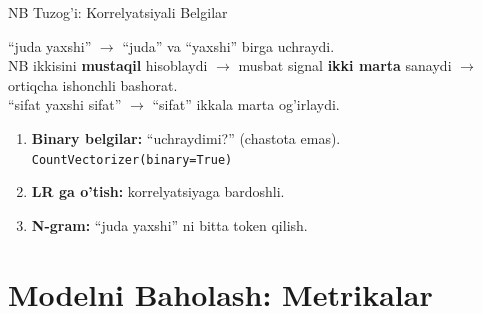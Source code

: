\documentclass[aspectratio=169,11pt]{beamer}
\begin{document}
\begin{frame}{NB Tuzog'i: Korrelyatsiyali Belgilar}
  \begin{tcolorbox}[warnbox,title=Muammo: CI taxmini buziladi]
    \small
    ``juda yaxshi'' $\to$ ``juda'' va ``yaxshi'' birga uchraydi.\\
    NB ikkisini \textbf{mustaqil} hisoblaydi
    $\to$ musbat signal \textbf{ikki marta} sanaydi
    $\to$ ortiqcha ishonchli bashorat.\\[4pt]
    ``sifat yaxshi sifat'' $\to$ ``sifat'' ikkala marta og'irlaydi.
  \end{tcolorbox}
  \vspace{5pt}
  \begin{tcolorbox}[okbox,title=Yechimlar]
    \small
    \begin{enumerate}
      \item \textbf{Binary belgilar:} ``uchraydimi?'' (chastota emas).\\
            \texttt{CountVectorizer(binary=True)}
      \item \textbf{LR ga o'tish:} korrelyatsiyaga bardoshli.
      \item \textbf{N-gram:} ``juda yaxshi'' ni bitta token qilish.
    \end{enumerate}
  \end{tcolorbox}
\end{frame}

\section[Metrikalar]{Modelni Baholash: Metrikalar}
\end{document}
